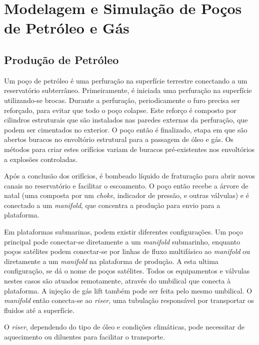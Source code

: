

\chapter{Modelagem e Simulação de Poços de Petróleo e Gás} \label{chap:2}



\section{Produção de Petróleo}

Um poço de petróleo é uma perfuração na superfície terrestre conectando a um reservatório subterrâneo. 
%
Primeiramente, é iniciada uma perfuração na superfície utilizando-se brocas. 
%
Durante a perfuração, periodicamente o furo precisa ser reforçado, para evitar que todo o poço colapse. 
%
Este reforço é composto por cilindros estruturais que são instalados nas paredes externas da perfuração, que podem ser cimentados no exterior.\cite{gasProdHand}
%
O poço então é finalizado, etapa em que são abertos buracos no envoltório estrutural para a passagem de óleo e gás. 
%
Os métodos para criar estes orifícios variam de buracos pré-existentes nos envoltórios a explosões controladas.
%


Após a conclusão dos orifícios, é bombeado líquido de fraturação para abrir novos canais no reservatório e facilitar o escoamento.
%
O poço então recebe a árvore de natal (uma composta por um \textit{choke}, indicador de pressão, e outras válvulas) e é conectado a um \textit{manifold}, que concentra a produção para envio para a plataforma.
%

Em plataformas submarinas, podem existir diferentes configurações. Um poço principal pode conectar-se diretamente a um \textit{manifold} submarinho, enquanto poços satélites podem conectar-se por linhas de fluxo multifásico ao \textit{manifold} ou diretamente a um \textit{manifold} na plataforma de produção.
%
A esta ultima configuração, se dá o nome de poços satélites. Todos os equipamentos e válvulas nestes casos são atuados remotamente, através do umbilical que conecta à plataforma. A injeção de gás lift também pode ser feita pelo mesmo umbilical.
%
O \textit{manifold} então conecta-se ao \textit{riser}, uma tubulação responsável por transportar os fluidos até a superfície.
%


O \textit{riser}, dependendo do tipo de óleo e condições climáticas, pode necessitar de aquecimento ou diluentes para facilitar o transporte.
%


